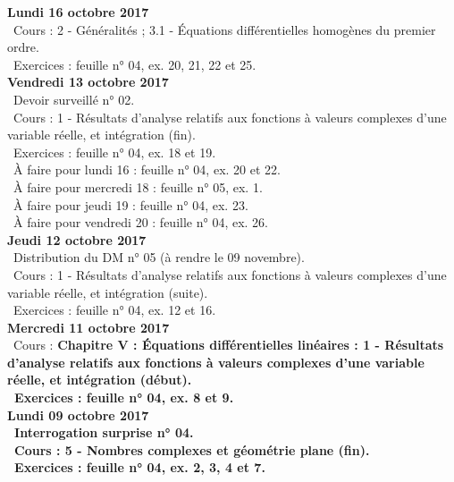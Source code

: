 \documentclass[12pt,a4paper]{article}
\begin{document}
\noindent\textbf{Lundi 16 octobre 2017}\\
\bu\ Cours : 2 - Généralités ; 3.1 - Équations différentielles homogènes du premier ordre.\\
\bu\ Exercices : feuille n° 04, ex. 20, 21, 22 et 25.\vspace{.4cm}\\

\noindent\textbf{Vendredi 13 octobre 2017}\\
\bu\ Devoir surveillé n° 02.\\
\bu\ Cours : 1 - Résultats d'analyse relatifs aux fonctions à valeurs complexes d'une variable réelle, et intégration 
(fin).\\
\bu\ Exercices : feuille n° 04, ex. 18 et 19.\\
\bu\ À faire pour lundi 16 : feuille n° 04, ex. 20 et 22.\\
\bu\ À faire pour mercredi 18 : feuille n° 05, ex. 1.\\
\bu\ À faire pour jeudi 19 : feuille n° 04, ex. 23.\\
\bu\ À faire pour vendredi 20 : feuille n° 04, ex. 26.\vspace{.4cm}\\

\noindent\textbf{Jeudi 12 octobre 2017}\\
\bu\ Distribution du DM n° 05 (à rendre le 09 novembre).\\
\bu\ Cours : 1 - Résultats d'analyse relatifs aux fonctions à valeurs complexes d'une variable réelle, et intégration 
(suite).\\
\bu\ Exercices : feuille n° 04, ex. 12 et 16.\vspace{.4cm}\\

\noindent\textbf{\bf Mercredi 11 octobre 2017}\\
\bu\ Cours : \bf Chapitre V \rm : Équations différentielles linéaires : 1 - Résultats d'analyse relatifs aux 
fonctions à valeurs complexes d'une variable réelle, et intégration (début).\\
\bu\ Exercices : feuille n° 04, ex. 8 et 9.\vspace{.4cm}\\

\noindent\textbf{\bf Lundi 09 octobre 2017}\\
\bu\ Interrogation surprise n° 04.\\
\bu\ Cours : 5 - Nombres complexes et géométrie plane (fin).\\
\bu\ Exercices : feuille n° 04, ex. 2, 3, 4 et 7.\vspace{.4cm}\\
\end{document}
